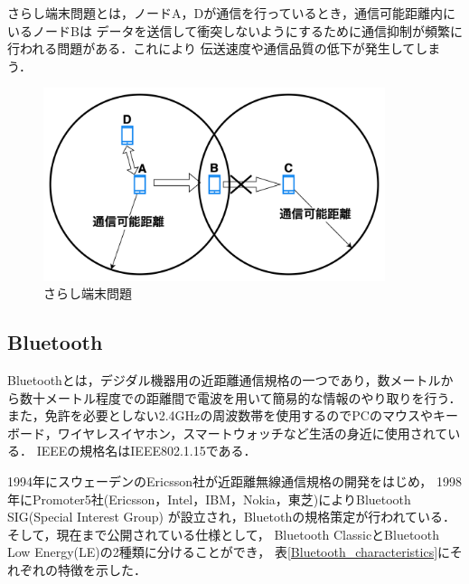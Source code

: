 \documentclass[a4paper, 11pt]{ltjsarticle}
\begin{document}
さらし端末問題とは，ノードA，Dが通信を行っているとき，通信可能距離内にいるノードBは
データを送信して衝突しないようにするために通信抑制が頻繁に行われる問題がある．これにより
伝送速度や通信品質の低下が発生してしまう．
\begin{figure}[H]
  \centering
  \includegraphics[width=100mm]{exposed_terminal_problem.png}
  \caption{さらし端末問題}
  \label{exposed_problem}
\end{figure}

\clearpage
\subsection{Bluetooth}
Bluetoothとは，デジダル機器用の近距離通信規格の一つであり，数メートルから数十メートル程度での距離間で電波を用いて簡易的な情報のやり取りを行う．
また，免許を必要としない2.4GHzの周波数帯を使用するのでPCのマウスやキーボード，ワイヤレスイヤホン，スマートウォッチなど生活の身近に使用されている．
IEEEの規格名はIEEE802.1.15である．

1994年にスウェーデンのEricsson社が近距離無線通信規格の開発をはじめ，
1998年にPromoter5社(Ericsson，Intel，IBM，Nokia，東芝)によりBluetooth SIG(Special Interest Group)
が設立され，Bluetothの規格策定が行われている．そして，現在まで公開されている仕様として，
Bluetooth ClassicとBluetooth Low Energy(LE)の2種類に分けることができ，
表\ref{Bluetooth_characteristics}にそれぞれの特徴を示した．
\end{document}

